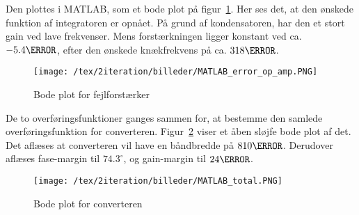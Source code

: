 \noindent Den plottes i MATLAB, som et bode plot på figur~\ref{fig:MATLAB_error_op_amp_2}. Her ses det, at den ønskede funktion af integratoren er opnået. På grund af kondensatoren, har den et stort gain ved lave frekvenser. Mens forstærkningen ligger konstant ved ca. $-5.4\decibel$, efter den ønskede knækfrekvens på ca. $318\hertz$.

\begin{figure}[H]
	\center
	\texttt{[image: /tex/2iteration/billeder/MATLAB\_error\_op\_amp.PNG]}
	\caption{Bode plot for fejlforstærker}
	\label{fig:MATLAB_error_op_amp_2}
\end{figure}

De to overføringsfunktioner ganges sammen for, at bestemme den samlede overføringsfunktion for converteren. Figur~\ref{fig:MATLAB_total_2} viser et åben sløjfe bode plot af det. Det aflæses at converteren vil have en båndbredde på $810\hertz$. Derudover aflæses fase-margin til $74.3^\circ$, og gain-margin til $24\decibel$.

\begin{figure}[H]
	\center
	\texttt{[image: /tex/2iteration/billeder/MATLAB\_total.PNG]}
	\caption{Bode plot for converteren}
	\label{fig:MATLAB_total_2}
\end{figure} 


